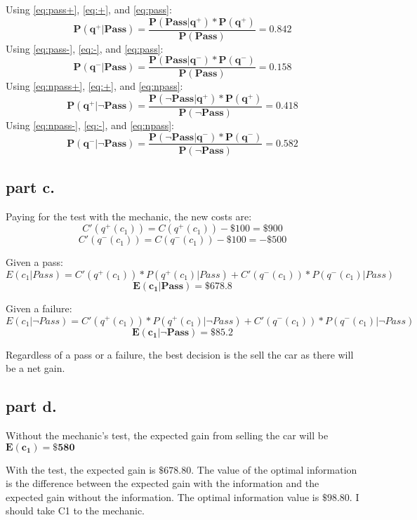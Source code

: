 Using \ref{eq:pass+}, \ref{eq:+}, and \ref{eq:pass}:
\begin{equation}
	\mathbf{P(q^+ | Pass) = \frac{P(Pass | q^+) * P(q^+)}{P(Pass)}  = 0.842}
\end{equation}
Using \ref{eq:pass-}, \ref{eq:-}, and \ref{eq:pass}:
\begin{equation}
	\mathbf{P(q^- | Pass) = \frac{P(Pass | q^-) * P(q^-)}{P(Pass)}  = 0.158}
\end{equation}
Using \ref{eq:npass+}, \ref{eq:+}, and \ref{eq:npass}:
\begin{equation}
	\mathbf{P(q^+ | \neg Pass) = \frac{P(\neg Pass | q^+) * P(q^+)}{P(\neg Pass)}  = 0.418}
\end{equation}
Using \ref{eq:npass-}, \ref{eq:-}, and \ref{eq:npass}:
\begin{equation}
	\mathbf{P(q^- | \neg Pass) = \frac{P(\neg Pass | q^-) * P(q^-)}{P(\neg Pass)}  = 0.582}
\end{equation}

\subsection{part c.}
Paying for the test with the mechanic, the new costs are:
\[ C'(q^+(c_1)) = C(q^+(c_1)) - \$100 = \$900 \]
\[ C'(q^-(c_1)) = C(q^-(c_1)) - \$100 = -\$500 \]

Given a pass:
\[E(c_1 | Pass) = C'(q^+(c_1))*P(q^+(c_1)|Pass) + C'(q^-(c_1))*P(q^-(c_1)|Pass)\]
\[\mathbf{E(c_1 | Pass) = \$678.8}\]

Given a failure:
\[E(c_1 |\neg Pass) = C'(q^+(c_1))*P(q^+(c_1)|\neg Pass) + C'(q^-(c_1))*P(q^-(c_1)|\neg Pass)\]
\[\mathbf{E(c_1 |\neg Pass) = \$85.2}\]

Regardless of a pass or a failure, the best decision is the sell the car as there will be a net gain.

\subsection{part d.}
Without the mechanic's test, the expected gain from selling the car will be 
$\mathbf{E(c_1) = \$580} $

With the test, the expected gain is $\mathbf{ \$678.80}$. The value of the optimal information is the difference between the expected gain with the information and the expected gain without the information. The optimal information value is $\mathbf{\$98.80}$.
I should take C1 to the mechanic.

